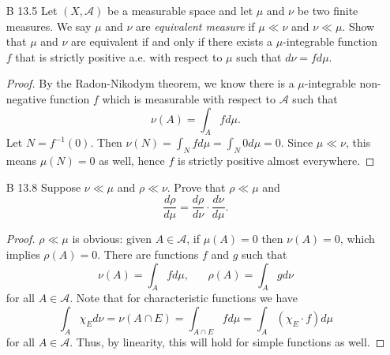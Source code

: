 \documentclass[10pt]{article}
\newcommand{\A}{\mathcal{A}}
\newcommand{\M}{\mathcal{M}}
\newcommand{\B}{\mathcal{B}}
\renewcommand{\P}{\mathcal{P}}
\begin{document}
\begin{enumerate}
\begin{proof}
We now know at least that $\M$ is finite, since it equals $\B$, and $|\B| \leq |\P(\A)|$, and $\A$ is finite.  It remains to show that $\A$ truly is the set of atoms, so suppose $E \in \M$ is an atom.  We know that $E = E_1 \cup \cdots \cup E_n$ for some $E_i \in \A$, which we may assume are distinct.  So we have $E_i \subseteq E$ for all $i$.  Thus, if $n > 1$, then we will have $\emptyset \subsetneq E_1 \subsetneq E_1 \cup E_2 \subseteq E$, a contradiction.  So $n = 1$, and thus $E \in \A$.  Conversely, if $E \in \A$ and $F \subseteq E$, then we may write $F$ as $F = F_1 \cup \cdots \cup F_n$ for some $F_i \in \A$.  Then $\emptyset \subsetneq F_i \subseteq E$ for all $i$.  But $E \in \A$, and so either $E = E_i$ for some $i$ or $E$ is disjoint from all the $E_i$.  The only possibility is that $n=1$ and $E = F = E_1$.  So $E$ is an atom.
\end{proof}

\item[B 13.5] Let $(X,\A)$ be a measurable space and let $\mu$ and $\nu$ be two finite measures.  We say $\mu$ and $\nu$ are \emph{equivalent measure} if $\mu \ll \nu$ and $\nu \ll \mu$.  Show that $\mu$ and $\nu$ are equivalent if and only if there exists a $\mu$-integrable function $f$ that is strictly positive a.e. with respect to $\mu$ such that $d\nu = fd\mu$.

\begin{proof}
By the Radon-Nikodym theorem, we know there is a $\mu$-integrable non-negative function $f$ which is measurable with respect to $\A$ such that
$$
\nu(A) = \int_A f d\mu.
$$
Let $N = f^{-1}(0)$.  Then $\nu(N) = \int_N f d\mu = \int_N 0 d\mu = 0$.  Since $\mu \ll \nu$, this means $\mu(N) = 0$ as well, hence $f$ is strictly positive almost everywhere.
\end{proof}

\item[B 13.8] Suppose $\nu \ll \mu$ and $\rho \ll \nu$.  Prove that $\rho \ll \mu$ and
$$
\frac{d\rho}{d\mu} = \frac{d\rho}{d\nu} \cdot \frac{d\nu}{d\mu}.
$$

\begin{proof}
$\rho \ll \mu$ is obvious: given $A \in \A$, if $\mu(A) = 0$ then $\nu(A) = 0$, which implies $\rho(A) = 0$.  There are functions $f$ and $g$ such that
$$
\nu(A) = \int_A f d\mu,  \hspace{20pt} \rho(A) = \int_A g d\nu
$$
for all $A \in \A$.  Note that for characteristic functions we have
$$
\int_A \chi_E d\nu = \nu(A \cap E) = \int_{A \cap E} f d\mu = \int_A (\chi_E \cdot f) d\mu
$$
for all $A \in \A$.  Thus, by linearity, this will hold for simple functions as well.


\end{proof}
\end{enumerate}
\end{document}
